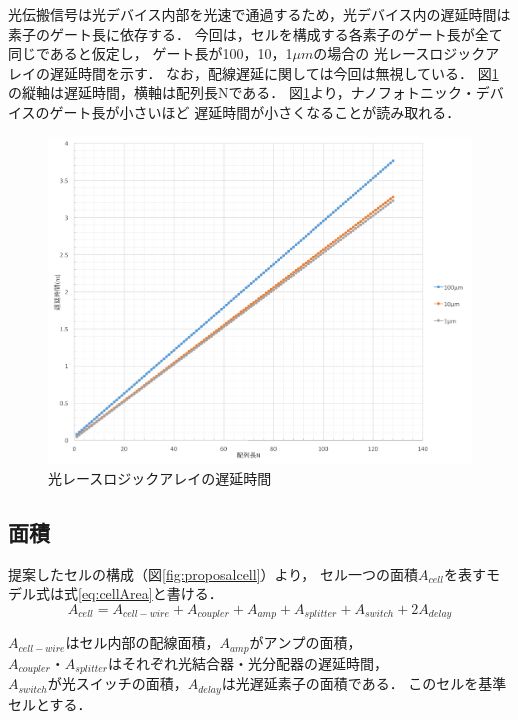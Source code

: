 光伝搬信号は光デバイス内部を光速で通過するため，光デバイス内の遅延時間は素子のゲート長に依存する．
今回は，セルを構成する各素子のゲート長が全て同じであると仮定し，
ゲート長が100，10，1$\mu m$の場合の
光レースロジックアレイの遅延時間を示す．
なお，配線遅延に関しては今回は無視している．
図\ref{fig:nanolatency}の縦軸は遅延時間，横軸は配列長Nである．
図\ref{fig:nanolatency}より，ナノフォトニック・デバイスのゲート長が小さいほど
遅延時間が小さくなることが読み取れる．
\begin{figure}[t!]
\begin{center}
\includegraphics[keepaspectratio,scale=0.5]{fig/4/nanolatency.png}
\caption{光レースロジックアレイの遅延時間}
\label{fig:nanolatency}
\end{center}
\end{figure}

\subsection{面積}
提案したセルの構成（図\ref{fig:proposalcell}）より，
セル一つの面積$A_{cell}$を表すモデル式は式\ref{eq:cellArea}と書ける．
\begin{equation}
A_{cell} = A_{cell-wire}+A_{coupler}+A_{amp}+A_{splitter}+A_{switch}+2A_{delay}
\label{eq:cellArea}
\end{equation}

$A_{cell-wire}はセル内部の配線面積，A_{amp}がアンプの面積，$
$A_{coupler}・A_{splitter}はそれぞれ光結合器・光分配器の遅延時間，$
$A_{switch}が光スイッチの面積，A_{delay}は光遅延素子の面積である．$
このセルを基準セルとする．

